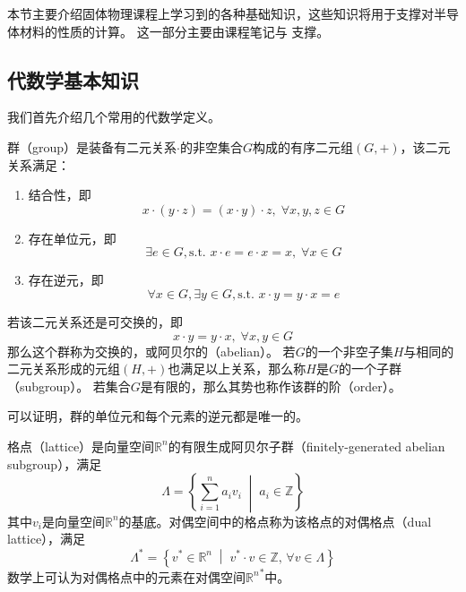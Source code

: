 
本节主要介绍固体物理课程上学习到的各种基础知识，这些知识将用于支撑对半导体材料的性质的计算。
这一部分主要由课程笔记与 \cite{solidphysics2014huang} 支撑。

\subsection{代数学基本知识}

我们首先介绍几个常用的代数学定义。

\begin{definition}
    群（group）是装备有二元关系$\cdot$的非空集合$G$构成的有序二元组$(G, +)$，该二元关系满足：
    \begin{enumerate}[nosep]
        \item 结合性，即
            \begin{equation}x\cdot ( y \cdot z) = (x \cdot y) \cdot z, \; \forall x,y,z \in G\end{equation}
        \item 存在单位元，即
            \begin{equation}\exists e \in G, \text{s.t. } x \cdot e = e\cdot x = x, \; \forall x \in G\end{equation}
        \item 存在逆元，即
            \begin{equation}\forall x \in G, \exists y \in G, \text{s.t. } x \cdot y = y \cdot x = e\end{equation}
    \end{enumerate}
    若该二元关系还是可交换的，即
    \begin{equation}x \cdot y = y \cdot x, \; \forall x, y \in G\end{equation}
    那么这个群称为交换的，或阿贝尔的（abelian）。
    若$G$的一个非空子集$H$与相同的二元关系形成的元组$(H,+)$也满足以上关系，那么称$H$是$G$的一个子群（subgroup）。
    若集合$G$是有限的，那么其势也称作该群的阶（order）。
\end{definition}

可以证明，群的单位元和每个元素的逆元都是唯一的。

\begin{definition}
    格点（lattice）是向量空间$\mathbb R^n$的有限生成阿贝尔子群（finitely-generated abelian subgroup），满足
    \begin{equation}\Lambda = \left\{ \sum_{i=1}^n a_i v_i \; \middle\vert\; a_i \in \mathbb Z \right\}\end{equation}
    其中$v_i$是向量空间$\mathbb R^n$的基底。对偶空间中的格点称为该格点的对偶格点（dual lattice），满足
    \begin{equation}\Lambda^* = \left\{ v^* \in \mathbb R^n \; \middle\vert \; v^* \cdot v \in \mathbb Z ,\, \forall v \in \Lambda \right\}\end{equation}
    数学上可认为对偶格点中的元素在对偶空间${{\mathbb{R}}^n}^*$中。
\end{definition}

